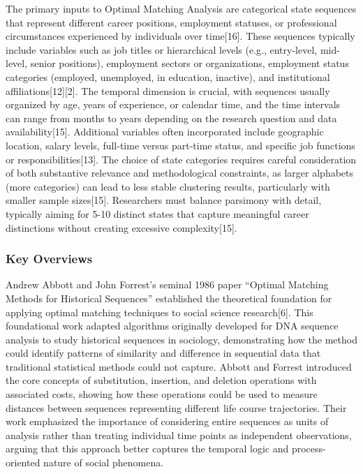 \documentclass[./main.tex]{subfiles}
\begin{document}
The primary inputs to Optimal Matching Analysis are categorical state
sequences that represent different career positions, employment
statuses, or professional circumstances experienced by individuals over
time{[}16{]}. These sequences typically include variables such as job
titles or hierarchical levels (e.g., entry-level, mid-level, senior
positions), employment sectors or organizations, employment status
categories (employed, unemployed, in education, inactive), and
institutional affiliations{[}12{]}{[}2{]}. The temporal dimension is
crucial, with sequences usually organized by age, years of experience,
or calendar time, and the time intervals can range from months to years
depending on the research question and data availability{[}15{]}.
Additional variables often incorporated include geographic location,
salary levels, full-time versus part-time status, and specific job
functions or responsibilities{[}13{]}. The choice of state categories
requires careful consideration of both substantive relevance and
methodological constraints, as larger alphabets (more categories) can
lead to less stable clustering results, particularly with smaller sample
sizes{[}15{]}. Researchers must balance parsimony with detail, typically
aiming for 5-10 distinct states that capture meaningful career
distinctions without creating excessive complexity{[}15{]}.

\subsubsection{Key Overviews}\label{key-overviews}

Andrew Abbott and John Forrest's seminal 1986 paper ``Optimal Matching
Methods for Historical Sequences'' established the theoretical
foundation for applying optimal matching techniques to social science
research{[}6{]}. This foundational work adapted algorithms originally
developed for DNA sequence analysis to study historical sequences in
sociology, demonstrating how the method could identify patterns of
similarity and difference in sequential data that traditional
statistical methods could not capture. Abbott and Forrest introduced the
core concepts of substitution, insertion, and deletion operations with
associated costs, showing how these operations could be used to measure
distances between sequences representing different life course
trajectories. Their work emphasized the importance of considering entire
sequences as units of analysis rather than treating individual time
points as independent observations, arguing that this approach better
captures the temporal logic and process-oriented nature of social
phenomena.
\end{document}
